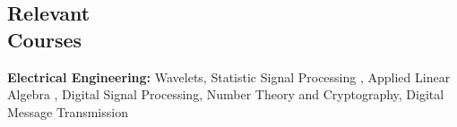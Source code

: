 \documentclass[margin,line]{res}
\newenvironment{list2}{
  \begin{list}{$\bullet$}{%
      \setlength{\itemsep}{0in}
      \setlength{\parsep}{0in} \setlength{\parskip}{0in}
      \setlength{\topsep}{0in} \setlength{\partopsep}{0in} 
      \setlength{\leftmargin}{0.2in}}}{\end{list}}
\begin{document}
\begin{resume}

%
%	
%
%	
% 
  	
\section{\sc Relevant\\ Courses} 
\textbf{Electrical Engineering:} Wavelets, Statistic Signal Processing , Applied Linear Algebra , Digital Signal Processing, Number Theory and Cryptography, Digital Message Transmission


\end{resume}
\end{document}
